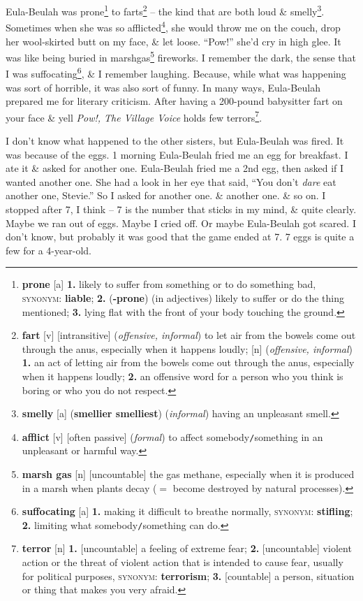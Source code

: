 \documentclass[oneside]{book}
\numberwithin{equation}{section}
\begin{document}
Eula-Beulah was prone\footnote{\textbf{prone} [a] \textbf{1.} likely to suffer from something or to do something bad, \textsc{synonym}: \textbf{liable}; \textbf{2.} (\textbf{-prone}) (in adjectives) likely to suffer or do the thing mentioned; \textbf{3.} lying flat with the front of your body touching the ground.} to farts\footnote{\textbf{fart} [v] [intransitive] (\textit{offensive, informal}) to let air from the bowels come out through the anus, especially when it happens loudly; [n] (\textit{offensive, informal}) \textbf{1.} an act of letting air from the bowels come out through the anus, especially when it happens loudly; \textbf{2.} an offensive word for a person who you think is boring or who you do not respect.} -- the kind that are both loud \& smelly\footnote{\textbf{smelly} [a] (\textbf{smellier smelliest}) (\textit{informal}) having an unpleasant smell.}. Sometimes when she was so afflicted\footnote{\textbf{afflict} [v] [often passive] (\textit{formal}) to affect somebody\texttt{/}something in an unpleasant or harmful way.}, she would throw me on the couch, drop her wool-skirted butt on my face, \& let loose. ``Pow!'' she'd cry in high glee. It was like being buried in marshgas\footnote{\textbf{marsh gas} [n] [uncountable] the gas methane, especially when it is produced in a marsh when plants decay ($=$ become destroyed by natural processes).} fireworks. I remember the dark, the sense that I was suffocating\footnote{\textbf{suffocating} [a] \textbf{1.} making it difficult to breathe normally, \textsc{synonym}: \textbf{stifling}; \textbf{2.} limiting what somebody\texttt{/}something can do.}, \& I remember laughing. Because, while what was happening was sort of horrible, it was also sort of funny. In many ways, Eula-Beulah prepared me for literary criticism. After having a 200-pound babysitter fart on your face \& yell \textit{Pow!, The Village Voice} holds few terrors\footnote{\textbf{terror} [n] \textbf{1.} [uncountable] a feeling of extreme fear; \textbf{2.} [uncountable] violent action or the threat of violent action that is intended to cause fear, usually for political purposes, \textsc{synonym}: \textbf{terrorism}; \textbf{3.} [countable] a person, situation or thing that makes you very afraid.}.

I don't know what happened to the other sisters, but Eula-Beulah was fired. It was because of the eggs. 1 morning Eula-Beulah fried me an egg for breakfast. I ate it \& asked for another one. Eula-Beulah fried me a 2nd egg, then asked if I wanted another one. She had a look in her eye that said, ``You don't \textit{dare} eat another one, Stevie.'' So I asked for another one. \& another one. \& so on. I stopped after 7, I think -- 7 is the number that sticks in my mind, \& quite clearly. Maybe we ran out of eggs. Maybe I cried off. Or maybe Eula-Beulah got scared. I don't know, but probably it was good that the game ended at 7. 7 eggs is quite a few for a 4-year-old.
\end{document}
